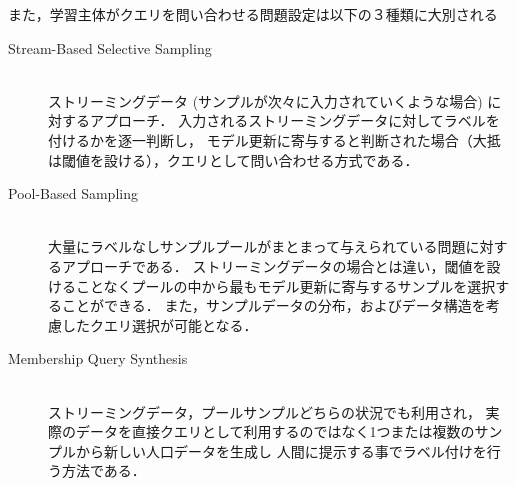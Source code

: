 また，学習主体がクエリを問い合わせる問題設定は以下の３種類に大別される
\begin{description}
    \item[Stream-Based Selective Sampling]\mbox{}\\
        ストリーミングデータ (サンプルが次々に入力されていくような場合) に対するアプローチ．
        入力されるストリーミングデータに対してラベルを付けるかを逐一判断し，
        モデル更新に寄与すると判断された場合（大抵は閾値を設ける），クエリとして問い合わせる方式である．
    \item[Pool-Based Sampling]\mbox{}\\
        大量にラベルなしサンプルプールがまとまって与えられている問題に対するアプローチである．
        ストリーミングデータの場合とは違い，閾値を設けることなくプールの中から最もモデル更新に寄与するサンプルを選択することができる．
        また，サンプルデータの分布，およびデータ構造を考慮したクエリ選択が可能となる．
    \item[Membership Query Synthesis]\mbox{}\\ 
        ストリーミングデータ，プールサンプルどちらの状況でも利用され，
        実際のデータを直接クエリとして利用するのではなく1つまたは複数のサンプルから新しい人口データを生成し
        人間に提示する事でラベル付けを行う方法である．
\end{description}

